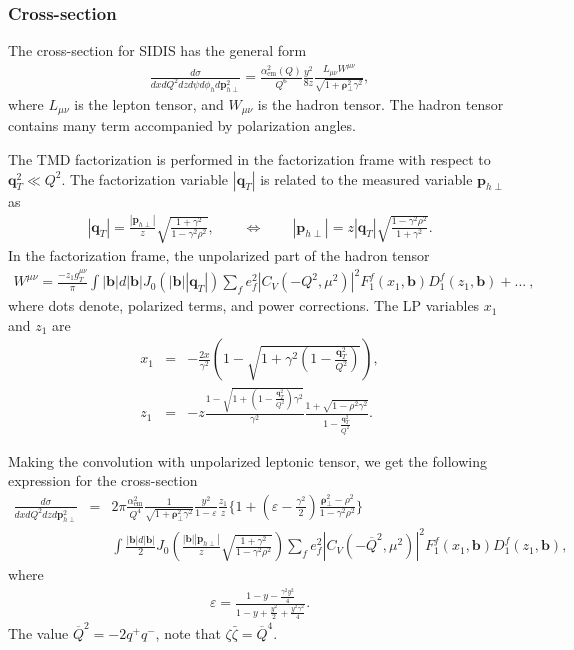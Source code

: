 \documentclass[prd,nofootinbib,eqsecnum,final]{revtex4}
\newcommand{\nn}{\nonumber}
\renewcommand{\(}{\left(}
\renewcommand{\)}{\right)}
\renewcommand{\[}{\left[}
\renewcommand{\]}{\right]}
\renewcommand{\vec}[1]{\bm{#1}}
\begin{document}
\subsubsection{Cross-section}

The cross-section for SIDIS has the general form
\begin{eqnarray}
\frac{d\sigma}{dx dQ^2 dzd\psi d\phi_h d \vec p^2_{h\perp}}=\frac{\alpha_{\text{em}}^2(Q)}{Q^6}\frac{y^2}{8z}\frac{L_{\mu\nu}W^{\mu\nu}}{\sqrt{1+\vec \rho^2_\perp \gamma^2}},
\end{eqnarray}
where $L_{\mu\nu}$ is the lepton tensor, and $W_{\mu\nu}$ is the hadron tensor. The hadron tensor contains many term accompanied by polarization angles. 

The TMD factorization is performed in the factorization frame with respect to $\vec q_T^2\ll Q^2$. The factorization variable $|\vec q_T|$ is related to the measured variable $\vec p_{h\perp}$ as
\begin{eqnarray}
|\vec q_T|=\frac{|\vec p_{h\perp}|}{z}\sqrt{\frac{1+\gamma^2}{1-\gamma^2\rho^2}},\qquad \Leftrightarrow \qquad |\vec p_{h\perp}|=z |\vec q_T|\sqrt{\frac{1-\gamma^2\rho^2}{1+\gamma^2}}.
\end{eqnarray}
In the factorization frame, the unpolarized part of the hadron tensor 
\begin{eqnarray}
W^{\mu\nu}=\frac{-z_1g_T^{\mu\nu}}{\pi}\int |\vec b| d |\vec b| J_0(|\vec b| |\vec q_T|)\sum_f e_f^2 |C_V(-Q^2,\mu^2)|^2 F_1^f(x_1,\vec b)D_1^f(z_1,\vec b)+...~,
\end{eqnarray}
where dots denote, polarized terms, and power corrections. The LP variables $x_1$ and $z_1$ are
\begin{eqnarray}
x_1&=&-\frac{2x}{\gamma^2}\(1-\sqrt{1+\gamma^2\(1-\frac{\vec q_T^2}{Q^2}\)}\),
\\
z_1&=&-z\frac{1-\sqrt{1+\(1-\frac{\vec q_T^2}{Q^2}\)\gamma^2}}{\gamma^2}\frac{1+\sqrt{1-\rho^2 \gamma^2}}{1-\frac{\vec q_T^2}{Q^2}}.
\end{eqnarray}

Making the convolution with unpolarized leptonic tensor, we get the following expression for the cross-section
\begin{eqnarray}
\frac{d\sigma}{dx dQ^2 dz d\vec p_{h\perp}^2}&=&2\pi\frac{\alpha^2_{\text{em}}}{Q^4}\frac{1}{\sqrt{1+\vec \rho_{\perp}^2 \gamma^2}}\frac{y^2}{1-\varepsilon}
\frac{z_1}{z}\Bigg\{1+\(\varepsilon-\frac{\gamma^2}{2}\)\frac{\vec \rho^2_\perp-\rho^2}{1-\gamma^2\rho^2}\Bigg\}
\\\nn && \int \frac{|\vec b|d|\vec b|}{2} J_0\(\frac{|\vec b||\vec p_{h\perp}|}{z}\sqrt{\frac{1+\gamma^2}{1-\gamma^2 \rho^2}}\)\sum_f e_f^2|C_V(-\overline{Q}^2,\mu^2)|^2 F_1^f(x_1,\vec b)D_1^f(z_1,\vec b),
\end{eqnarray}
where 
\begin{eqnarray}
\varepsilon=\frac{1-y-\frac{\gamma^2y^2}{4}}{1-y+\frac{y^2}{2}+\frac{y^2 \gamma^2}{4}}.
\end{eqnarray}
The value $\overline{Q}^2=-2q^+q^-$, note that $\zeta\bar \zeta=\overline{Q}^4$. 
\end{document}

